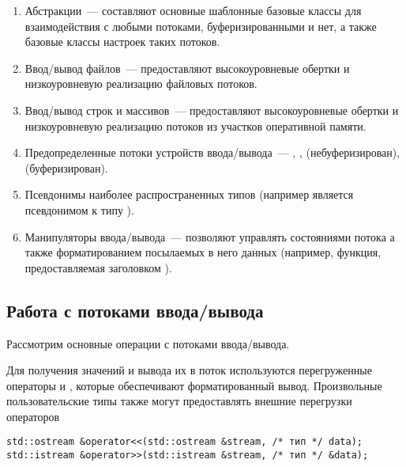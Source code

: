 \begin{enumerate}
    \item Абстракции~--- составляют основные шаблонные базовые классы для взаимодействия с любыми потоками, буферизированными и нет, а также базовые классы
          настроек таких потоков.
    \item Ввод/вывод файлов~--- предоставляют высокоуровневые обертки и низкоуровневую реализацию файловых потоков.
    \item Ввод/вывод строк и массивов~--- предоставляют высокоуровневые обертки и низкоуровневую реализацию потоков из участков оперативной памяти.
    \item Предопределенные потоки устройств ввода/вывода~--- , ,  (небуферизирован),  (буферизирован)\footnotemark.
    \item Псевдонимы наиболее распространенных типов (например  является псевдонимом к типу ).
    \item Манипуляторы ввода/вывода~--- позволяют управлять состояниями потока а также форматированием посылаемых в него
          данных (например, функция, предоставляемая заголовком ).
\end{enumerate}


\subsection{Работа с потоками ввода/вывода}
Рассмотрим основные операции с потоками ввода/вывода.

Для получения значений и вывода их в поток используются перегруженные операторы  и , которые обеспечивают
форматированный вывод. Произвольные пользовательские типы также могут предоставлять внешние перегрузки операторов
\begin{verbatim}
std::ostream &operator<<(std::ostream &stream, /* тип */ data);
std::istream &operator>>(std::istream &stream, /* тип */ &data);
\end{verbatim}

